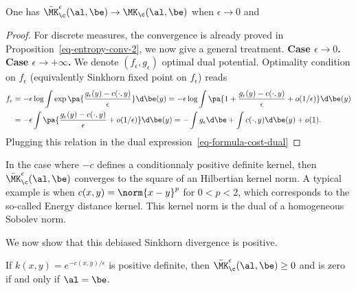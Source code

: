 \begin{prop}
	One has $\bar\MK_\c^\epsilon(\al,\be) \rightarrow \MK_\c(\al,\be)$ when $\epsilon\rightarrow 0$ and
\end{prop}
\begin{proof}For discrete measures, the convergence is already proved in Proposition~\eqref{eq-entropy-conv-2}, we now give a general treatment.
	\textbf{Case $\epsilon \rightarrow 0$.} 
	\textbf{Case $\epsilon \rightarrow +\infty$.} We denote $(f_\epsilon,g_\epsilon)$ optimal dual potential. Optimality condition on $f_\epsilon$ (equivalently Sinkhorn fixed point on $f_\epsilon$) reads
	\begin{align*}
		f_\epsilon &= -\epsilon \log \int \exp\pa{ \frac{g_\epsilon(y) - c(\cdot,y)}{\epsilon} } \d \be(y)
		=	-\epsilon \log \int \pa{ 1 + \frac{g_\epsilon(y) - c(\cdot,y)}{\epsilon} + o(1/\epsilon) } \d \be(y) \\		
		&=	-\epsilon \int \pa{ \frac{g_\epsilon(y) - c(\cdot,y)}{\epsilon} + o(1/\epsilon) } \d \be(y)
		= - \int g_\epsilon \d\be + \int c(\cdot,y) \d \be(y) + o(1).  
	\end{align*}
	Plugging this relation in the dual expression~\eqref{eq-formula-cost-dual}
\end{proof}

In the case where $-c$ defines a conditionnaly positive definite kernel, then $\bar\MK_\c^\epsilon(\al,\be)$ converges to the square of an Hilbertian kernel norm. A typical example is when $c(x,y)=\norm{x-y}^p$ for $0 < p < 2$, which corresponds to the so-called Energy distance kernel. This kernel norm is the dual of a homogeneous Sobolev norm.

We now show that this debiased Sinkhorn divergence is positive.

\begin{prop}
	If $k(x,y)=e^{-c(x,y)/\epsilon}$ is positive definite, then $\bar\MK_\c^\epsilon(\al,\be) \geq 0$ and is zero if and only if $\al=\be$.
\end{prop}

